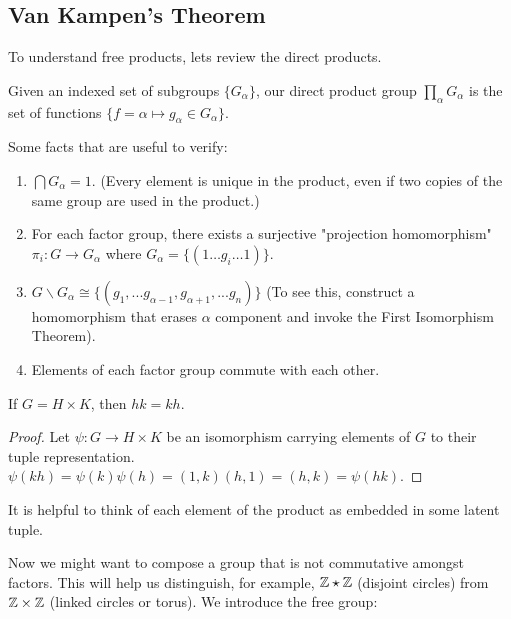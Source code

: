 \documentclass[10pt]{article}
\begin{document}
\subsection{Van Kampen's Theorem}

To understand free products, lets review the direct products.

\begin{definition}
	Given an indexed set of subgroups $\{G_{\alpha}\}$, our direct product group $\prod_{\alpha} G_{\alpha}$ is the set of functions $\{ f = \alpha \mapsto g_{\alpha} \in G_{\alpha} \}$.
\end{definition}

Some facts that are useful to verify:

\begin{enumerate}
	\item{$\bigcap G_{\alpha} = 1$. (Every element is unique in the product, even if two copies of the same group are used in the product.)}
	\item{For each factor group, there exists a surjective "projection homomorphism" $\pi_i: G \to G_{\alpha}$ where $G_{\alpha} = \{(1 \dots g_i \dots 1) \}$. }
	\item{ $G \backslash G_{\alpha} \cong \{ (g_1, ... g_{\alpha-1}, g_{\alpha+1}, ...  g_n) \}$ (To see this, construct a homomorphism that erases $\alpha$ component and invoke the First Isomorphism Theorem).}
	\item{Elements of each factor group commute with each other.}
\end{enumerate}


\begin{proposition} 
	If $G = H \times K$, then $hk = kh$.
\end{proposition}

\begin{proof}
	Let $\psi: G \to H \times K$ be an isomorphism carrying elements of $G$ to their tuple representation. $\psi(kh) = \psi(k)\psi(h) = (1, k)(h, 1) = (h, k) = \psi(hk).$
\end{proof}

It is helpful to think of each element of the product as embedded in some latent tuple. 

Now we might want to compose a group that is not commutative amongst factors. This will help us distinguish, for example, $\mathbb{Z} \star \mathbb{Z}$ (disjoint circles) from $\mathbb{Z} \times \mathbb{Z}$ (linked circles or torus). We introduce the free group:
\end{document}
